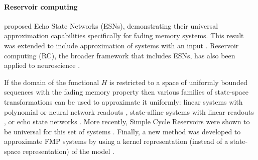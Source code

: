 \documentclass{article}
\newcounter{ct}
\begin{document}
\paragraph{Reservoir computing}
\citet{jaeger2001echo} proposed Echo State Networks (ESNs), demonstrating their universal approximation capabilities specifically for fading memory systems.
This result was extended to include approximation of systems with an input  \citep{manjunath2013echo}.
Reservoir computing (RC), the broader framework that includes ESNs, has also been applied to neuroscience  \citep{auslender2024decoding}.


If the domain of the functional $H$ is restricted to a space of uniformly bounded sequences with the fading memory property then various families of state-space transformations can be used to approximate it uniformly: 
 linear systems with polynomial or neural network readouts  \citep{boyd1985fading,grigoryeva2018universal,gonon2019reservoir}, state-affine systems with linear readouts  \citep{grigoryeva2018universal}, or echo state networks  \citep{grigoryeva2018echo,gonon2019reservoir,gonon2021fading,gonon2023approximation}.
 More recently, Simple Cycle Reservoirs were shown to be universal for this set of systems  \citep{li2023simple}.
Finally, a new method was developed to approximate FMP systems by using a kernel representation (instead of a state-space representation) of the model  \citep{huo2024kernel}. %

\end{document}

